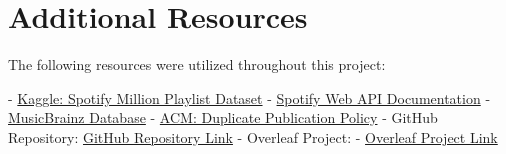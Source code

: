 \documentclass[runningheads]{llncs}
\begin{document}
\section{Additional Resources}
The following resources were utilized throughout this project:

- \href{https://www.kaggle.com/datasets/shubhendra/million-playlist-dataset}{Kaggle: Spotify Million Playlist Dataset}
- \href{https://developer.spotify.com/documentation/web-api/}{Spotify Web API Documentation}
- \href{https://musicbrainz.org/}{MusicBrainz Database}
- \href{https://www.acm.org/publications/policies/duplicate-publication}{ACM: Duplicate Publication Policy}
- GitHub Repository: 
  \href{https://github.com/anythonyschomer/Capstone-Project-Report}{GitHub Repository Link}
- Overleaf Project: 
  - \href{https://www.overleaf.com/read/mvxxxcdzxrjr#c7bfc4}{Overleaf Project Link}

\printbibliography[title={mybibliography.bib}]

\end{document}
